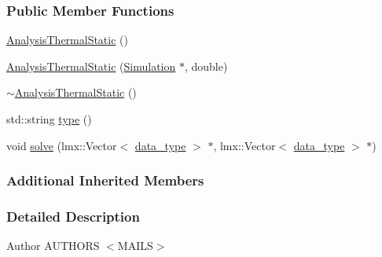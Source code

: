 \subsubsection*{Public Member Functions}
\begin{DoxyCompactItemize}
\item 
\hyperlink{classmknix_1_1_analysis_thermal_static_ae789aef70fc130d8478e09374e2541f5}{Analysis\-Thermal\-Static} ()
\item 
\hyperlink{classmknix_1_1_analysis_thermal_static_a340001a574c5c2ad92020c6bc8b99602}{Analysis\-Thermal\-Static} (\hyperlink{classmknix_1_1_simulation}{Simulation} $\ast$, double)
\item 
\hyperlink{classmknix_1_1_analysis_thermal_static_a0164991e5c2829051b9e886cb07e3af7}{$\sim$\-Analysis\-Thermal\-Static} ()
\item 
std\-::string \hyperlink{classmknix_1_1_analysis_thermal_static_a14a7b53403f7523ccb783129e928241b}{type} ()
\item 
void \hyperlink{classmknix_1_1_analysis_thermal_static_a603b8f8431172ab62f351393cb60adae}{solve} (lmx\-::\-Vector$<$ \hyperlink{namespacemknix_a16be4b246fbf2cceb141e3a179111020}{data\-\_\-type} $>$ $\ast$, lmx\-::\-Vector$<$ \hyperlink{namespacemknix_a16be4b246fbf2cceb141e3a179111020}{data\-\_\-type} $>$ $\ast$)
\end{DoxyCompactItemize}
\subsubsection*{Additional Inherited Members}


\subsubsection{Detailed Description}
\begin{DoxyAuthor}{Author}
A\-U\-T\-H\-O\-R\-S $<$\-M\-A\-I\-L\-S$>$ 
\end{DoxyAuthor}


